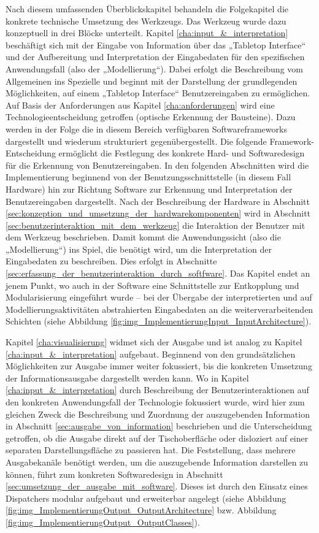 Nach diesem umfassenden Überblickskapitel behandeln die Folgekapitel die konkrete technische Umsetzung des Werkzeugs. Das Werkzeug wurde dazu konzeptuell in drei Blöcke unterteilt. Kapitel \ref{cha:input_&_interpretation} beschäftigt sich mit der Eingabe von Information über das „Tabletop Interface“ und der Aufbereitung und Interpretation der Eingabedaten für den spezifischen Anwendungsfall (also der „Modellierung“). Dabei erfolgt die Beschreibung vom Allgemeinen ins Spezielle und beginnt mit der Darstellung der grundlegenden Möglichkeiten, auf einem „Tabletop Interface“ Benutzereingaben zu ermöglichen. Auf Basis der Anforderungen aus Kapitel \ref{cha:anforderungen} wird eine Technologieentscheidung getroffen (optische Erkennung der Bausteine). Dazu werden in der Folge die in diesem Bereich verfügbaren Softwareframeworks dargestellt und wiederum strukturiert gegenübergestellt. Die folgende Framework-Entscheidung ermöglicht die Festlegung des konkrete Hard- und Softwaredesign für die Erkennung von Benutzereingaben. In den folgenden Abschnitten wird die Implementierung beginnend von der Benutzungsschnittstelle (in diesem Fall Hardware) hin zur Richtung Software zur Erkennung und Interpretation der Benutzereingaben dargestellt. Nach der Beschreibung der Hardware in Abschnitt \ref{sec:konzeption_und_umsetzung_der_hardwarekomponenten} wird in Abschnitt \ref{sec:benutzerinteraktion_mit_dem_werkzeug} die Interaktion der Benutzer mit dem Werkzeug beschrieben. Damit kommt die Anwendungssicht (also die „Modellierung“) ins Spiel, die benötigt wird, um die Interpretation der Eingabedaten zu beschreiben. Dies erfolgt in Abschnitte \ref{sec:erfassung_der_benutzerinteraktion_durch_softfware}. Das Kapitel endet an jenem Punkt, wo auch in der Software eine Schnittstelle zur Entkopplung und Modularisierung eingeführt wurde -- bei der Übergabe der interpretierten und auf Modellierungsaktivitäten abstrahierten Eingabedaten an die weiterverarbeitenden Schichten (siehe Abbildung \ref{fig:img_ImplementierungInput_InputArchitecture}).

Kapitel \ref{cha:visualisierung} widmet sich der Ausgabe und ist analog zu Kapitel \ref{cha:input_&_interpretation} aufgebaut. Beginnend von den grundsätzlichen Möglichkeiten zur Ausgabe immer weiter fokussiert, bis die konkreten Umsetzung der Informationsausgabe dargestellt werden kann. Wo in Kapitel \ref{cha:input_&_interpretation} durch Beschreibung der Benutzerinteraktionen auf den konkreten Anwendungsfall der Technologie fokussiert wurde, wird hier zum gleichen Zweck die Beschreibung und Zuordnung der auszugebenden Information in Abschnitt \ref{sec:ausgabe_von_information} beschrieben und die Unterscheidung getroffen, ob die Ausgabe direkt auf der Tischoberfläche oder disloziert auf einer separaten Darstellungsfläche zu passieren hat. Die Feststellung, dass mehrere Ausgabekanäle benötigt werden, um die auszugebende Information darstellen zu können, führt zum konkreten Softwaredesign in Abschnitt \ref{sec:umsetzung_der_ausgabe_mit_software}. Dieses ist durch den Einsatz eines Dispatchers modular aufgebaut und erweiterbar angelegt (siehe Abbildung \ref{fig:img_ImplementierungOutput_OutputArchitecture} bzw. Abbildung \ref{fig:img_ImplementierungOutput_OutputClasses}).

